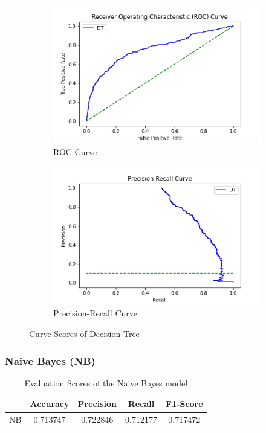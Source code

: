 \documentclass[11pt]{article}
\begin{document}
\begin{figure}[ht]
\begin{subfigure}{0.5\textwidth}
\includegraphics[scale=0.45]{roc_dt.png} 
\caption{ROC Curve}
\label{fig:rocDT}
\end{subfigure}
\begin{subfigure}{0.5\textwidth}
\includegraphics[scale=0.45]{prs_dt.png}
\caption{Precision-Recall Curve}
\label{fig:prsDT}
\end{subfigure}
\label{fig:csDT}
\caption{Curve Scores of Decision Tree}
\end{figure}

\clearpage
\subsubsection{Naive Bayes (NB)}
\begin{table}[ht]
\centering
\caption{\label{tab:nbMetrics}Evaluation Scores of the Naive Bayes model}
\begin{adjustbox}{width=0.7\textwidth}
\begin{tabular}{|c|c|c|c|c|}
\hline
\textbf{} & \textbf{Accuracy} & \textbf{Precision} & \textbf{Recall} & \textbf{F1-Score} \\ \hline
NB        & 0.713747          & 0.722846           & 0.712177        & 0.717472          \\ \hline
\end{tabular}
\end{adjustbox}
\end{table}
\end{document}

